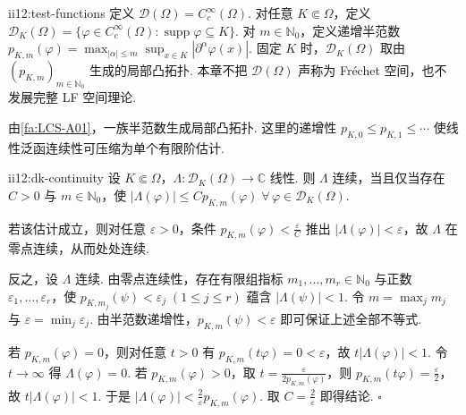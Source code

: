 \begin{FADefinition}[A][测试函数与固定支撑测试函数空间]{ii12:test-functions}
定义 \(\displaystyle \mathcal D(\Omega)=C_c^\infty(\Omega)\). 对任意 \(\displaystyle K\Subset\Omega\)，定义 \(\displaystyle \mathcal D_K(\Omega)=\{\varphi\in C_c^\infty(\Omega):\operatorname{supp}\varphi\subseteq K\}\). 对 \(\displaystyle m\in\mathbb N_0\)，定义递增半范数 \(\displaystyle p_{K,m}(\varphi)=\max_{|\alpha|\leqslant m}\sup_{x\in K}|\partial^\alpha\varphi(x)|\). 固定 \(\displaystyle K\) 时，\(\displaystyle\mathcal D_K(\Omega)\) 取由 \(\displaystyle(p_{K,m})_{m\in\mathbb N_0}\) 生成的局部凸拓扑. 本章不把 \(\displaystyle\mathcal D(\Omega)\) 声称为 Fréchet 空间，也不发展完整 LF 空间理论.
\end{FADefinition}

由\autoref{fa:LCS-A01}，一族半范数生成局部凸拓扑. 这里的递增性 \(\displaystyle p_{K,0}\leqslant p_{K,1}\leqslant\cdots\)
使线性泛函连续性可压缩为单个有限阶估计.

\begin{FAProposition}{ii12:dk-continuity}
设 \(\displaystyle K\Subset\Omega\)，\(\displaystyle\Lambda:\mathcal D_K(\Omega)\to\mathbb C\) 线性. 则 \(\displaystyle\Lambda\) 连续，当且仅当存在 \(\displaystyle C>0\) 与 \(\displaystyle m\in\mathbb N_0\)，使 \(\displaystyle |\Lambda(\varphi)| \leqslant C p_{K,m}(\varphi) \; \forall\,\varphi\in\mathcal D_K(\Omega).\)
\end{FAProposition}

\begin{FAProof}
若该估计成立，则对任意 \(\displaystyle\varepsilon>0\)，条件 \(\displaystyle p_{K,m}(\varphi)<\frac{\varepsilon}{C}\) 推出 \(\displaystyle|\Lambda(\varphi)|<\varepsilon\)，故 \(\displaystyle\Lambda\) 在零点连续，从而处处连续.

反之，设 \(\displaystyle\Lambda\) 连续. 由零点连续性，存在有限组指标 \(\displaystyle m_1,\dots,m_r\in\mathbb N_0\) 与正数 \(\displaystyle\varepsilon_1,\dots,\varepsilon_r\)，使 \(\displaystyle p_{K,m_j}(\psi)<\varepsilon_j \;(1\leqslant j\leqslant r)\)
蕴含 \(\displaystyle|\Lambda(\psi)|<1\). 令 \(\displaystyle m=\max_jm_j\) 与 \(\displaystyle\varepsilon=\min_j\varepsilon_j\). 由半范数递增性，\(\displaystyle p_{K,m}(\psi)<\varepsilon\) 即可保证上述全部不等式.

若 \(\displaystyle p_{K,m}(\varphi)=0\)，则对任意 \(\displaystyle t>0\) 有 \(\displaystyle p_{K,m}(t\varphi)=0<\varepsilon\)，故 \(\displaystyle t|\Lambda(\varphi)|<1\). 令 \(\displaystyle t\to\infty\) 得 \(\displaystyle\Lambda(\varphi)=0\). 若 \(\displaystyle p_{K,m}(\varphi)>0\)，取 \(\displaystyle t=\frac{\varepsilon}{2p_{K,m}(\varphi)}\)，则 \(\displaystyle p_{K,m}(t\varphi)=\frac{\varepsilon}{2}\)，故 \(\displaystyle t|\Lambda(\varphi)|<1.\)
于是 \(\displaystyle |\Lambda(\varphi)| < \frac{2}{\varepsilon}p_{K,m}(\varphi).\)
取 \(\displaystyle C=\frac{2}{\varepsilon}\) 即得结论.
\hfill\(\square\)
\end{FAProof}

